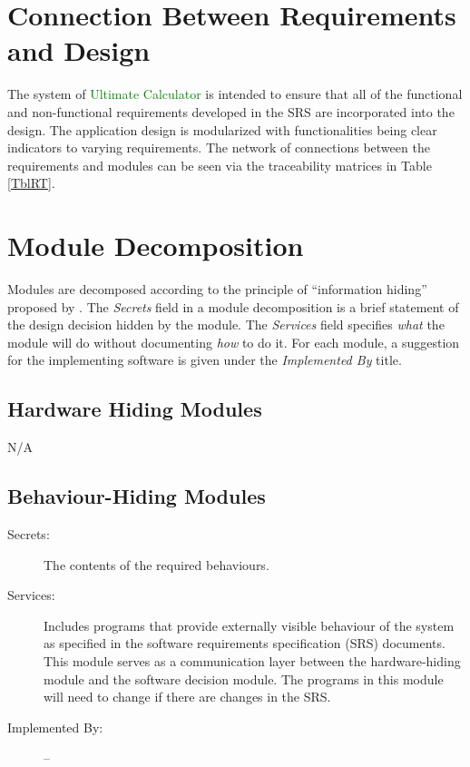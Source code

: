 \documentclass[12pt, titlepage]{article}
\begin{document}
\section{Connection Between Requirements and Design} \label{SecConnection}
The system of \textcolor{Green}{Ultimate Calculator} is intended to ensure that all of the functional and non-functional requirements developed in the SRS are incorporated into the design. The application design is modularized with functionalities being clear indicators to varying requirements. The network of connections between the requirements and modules can be seen via the traceability matrices in Table \ref{TblRT}.

\section{Module Decomposition} \label{SecMD}

Modules are decomposed according to the principle of ``information hiding''
proposed by \citet{ParnasEtAl1984}. The \emph{Secrets} field in a module
decomposition is a brief statement of the design decision hidden by the
module. The \emph{Services} field specifies \emph{what} the module will do
without documenting \emph{how} to do it. For each module, a suggestion for the
implementing software is given under the \emph{Implemented By} title.

\subsection{Hardware Hiding Modules}

N/A

\subsection{Behaviour-Hiding Modules}

\begin{description}
\item[Secrets:]The contents of the required behaviours.
\item[Services:]Includes programs that provide externally visible behaviour of
  the system as specified in the software requirements specification (SRS)
  documents. This module serves as a communication layer between the
  hardware-hiding module and the software decision module. The programs in this
  module will need to change if there are changes in the SRS.
\item[Implemented By:] --
\end{description}
\end{document}
